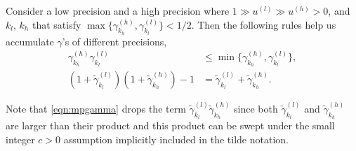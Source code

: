 \begin{lemma}
	Consider a low precision and a high precision where $1 \gg u^{(l)} \gg u^{(h)}>0$, and $k_l$, $k_h$ that satisfy $\max\{\gamma^{(h)}_{k_{h}},\gamma^{(l)}_{k_{l}}\} < 1/2$.
	Then the following rules help us accumulate $\gamma$'s of different precisions,
	\begin{align}
	\gamma^{(h)}_{k_{h}}\gamma^{(l)}_{k_{l}} &\leq \min\{\gamma^{(h)}_{k_{h}},\gamma^{(l)}_{k_{l}} \},\\ 
	(1+\tilde{\gamma}_{k_l}^{(l)})(1+\tilde{\gamma}_{k_h}^{(h)}) -1 &= \tilde{\gamma}_{k_l}^{(l)}+\tilde{\gamma}_{k_h}^{(h)}. \label{eqn:mpgamma}
	\end{align} 
\end{lemma}
Note that \cref{eqn:mpgamma} drops the term $\tilde{\gamma}_{k_l}^{(l)}\tilde{\gamma}_{k_h}^{(h)}$ since both $\tilde{\gamma}_{k_l}^{(l)}$ and $\tilde{\gamma}_{k_h}^{(h)}$ are larger than their product and this product can be swept under the small integer $c > 0$ assumption implicitly included in the tilde notation.
